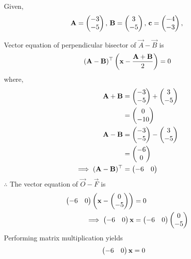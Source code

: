 \documentclass[11pt]{book}
\begin{document}
\begin{enumerate}[label=\thesection.\arabic*.,ref=\thesection.\theenumi]
Given,
\begin{align}
\mathbf{A}=\begin{pmatrix}-3 \\ -5\end{pmatrix},\,
\mathbf{B}=\begin{pmatrix}3\\-5\end{pmatrix},\,
	\mathbf{c}=\begin{pmatrix}-4\\-3\end{pmatrix},\,
\end{align}

Vector equation of perpendicular bisector of $\vec{A}-\vec{B}$ is
\begin{align}
 (\mathbf{A}-\mathbf{B})^\top  \left( \mathbf{x} - \frac{\mathbf{A}+\mathbf{B}}{2}\right) = 0
\end{align}
where,
\begin{align}
\mathbf{A}+\mathbf{B}&=\begin{pmatrix}-3\\-5\end{pmatrix}+\begin{pmatrix}3\\-5\end{pmatrix}\\
&=\begin{pmatrix}0\\-10\end{pmatrix}\\
\mathbf{A}-\mathbf{B} &= \begin{pmatrix}-3\\-5\end{pmatrix}-\begin{pmatrix}3\\-5\end{pmatrix}\\
&=\begin{pmatrix}-6\\0\end{pmatrix}\\
\implies (\mathbf{A}-\mathbf{B})^\top &= \begin{pmatrix}-6&0\end{pmatrix}
\end{align}
$\therefore $ The vector equation of $\vec{O}-\vec{F}$ is
\begin{align}
\begin{pmatrix}-6&0\end{pmatrix} \left( \mathbf{x}-\begin{pmatrix}0\\-5\end{pmatrix} \right)&=0\\
\implies \begin{pmatrix}-6&0\end{pmatrix}\mathbf{x}&=\begin{pmatrix}-6&0\end{pmatrix}\begin{pmatrix}0\\-5\end{pmatrix}
\end{align}
Performing matrix multiplication yields
\begin{align}
\begin{pmatrix}-6&0\end{pmatrix}\mathbf{x}&=0
\end{align}\\


\end{enumerate}
\end{document}
